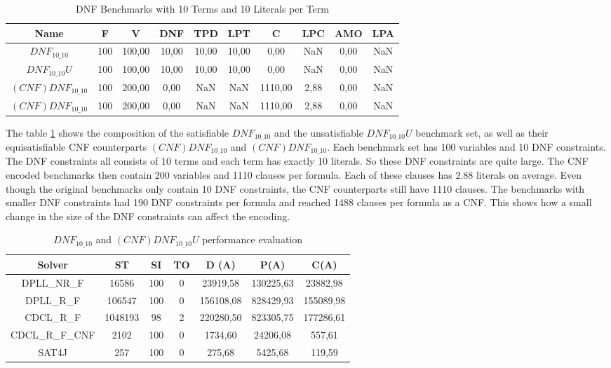 \begin{table}[!htb]
\centering
\caption{DNF Benchmarks with 10 Terms and 10 Literals per Term}
\label{tab:dnf1010}
\begin{tabular}{|c|c|c|c|c|c|c|c|c|c|}
\hline
Name & F & V & DNF & TPD & LPT & C & LPC & AMO & LPA \\
\hline
$DNF_{10\_10}$ & 100 & 100,00 & 10,00 & 10,00 & 10,00 & 0,00 & NaN & 0,00 & NaN \\ 
 \hline 
$DNF_{10\_10}U$ & 100 & 100,00 & 10,00 & 10,00 & 10,00 & 0,00 & NaN & 0,00 & NaN \\ 
 \hline 
$(CNF)DNF_{10\_10}$ & 100 & 200,00 & 0,00 & NaN & NaN & 1110,00 & 2,88 & 0,00 & NaN \\ 
 \hline 
$(CNF)DNF_{10\_10}$ & 100 & 200,00 & 0,00 & NaN & NaN & 1110,00 & 2,88 & 0,00 & NaN \\ 
 \hline 
\end{tabular}
\end{table}

The table \ref{tab:dnf1010} shows the composition of the satisfiable $DNF_{10\_10}$ and the unsatisfiable $DNF_{10\_10}U$ benchmark set, as well as their equisatisfiable CNF counterparts $(CNF)DNF_{10\_10}$ and $(CNF)DNF_{10\_10}$. Each benchmark set has 100 variables and 10 DNF constraints. The DNF constraints all consists of 10 terms and each term has exactly 10 literals. So these DNF constraints are quite large. The CNF encoded benchmarks then contain 200 variables and 1110 clauses per formula. Each of these clauses has 2.88 literals on average. Even though the original benchmarks only contain 10 DNF constraints, the CNF counterparts still have 1110 clauses. The benchmarks with smaller DNF constraints had 190 DNF constraints per formula and reached 1488 clauses per formula as a CNF. This shows how a small change in the size of the DNF constraints can affect the encoding.

\begin{table}[!htb]
\centering
\caption{$DNF_{10\_10}$ and $(CNF)DNF_{10\_10}U$ performance evaluation}
\label{tab:dnf1010Sat}
\begin{tabular}{|c|c|c|c|c|c|c|}
\hline
Solver & ST & SI & TO & D (A) & P(A) & C(A)\\
\hline
DPLL\_NR\_F & 16586 & 100 & 0 & 23919,58 & 130225,63 & 23882,98 \\
\hline
DPLL\_R\_F & 106547 & 100 & 0 & 156108,08 & 828429,93 & 155089,98 \\
\hline
CDCL\_R\_F & 1048193 & 98 & 2 & 220280,50 & 823305,75 & 177286,61 \\
\hline
CDCL\_R\_F\_CNF & 2102 & 100 & 0 & 1734,60 & 24206,08 & 557,61 \\
\hline
SAT4J & 257 & 100 & 0 & 275,68 & 5425,68 & 119,59 \\
\hline
\end{tabular}
\end{table}


